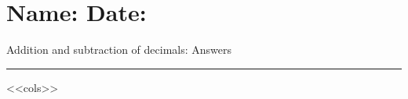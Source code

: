 \documentclass[leqno, 12pt]{article}
\def \HeadingAnswers {\section*{\Large Name: \underline{\hspace{8cm}} \hfill Date: \underline{\hspace{3cm}}} \vspace{-3mm}
{Addition and subtraction of decimals: Answers} \vspace{1pt}\hrule}
\begin{document}
    \HeadingAnswers
    \vspace{-5mm}
    \begin{multicols}{3}
        <<cols>>
    \end{multicols}
\end{document}
